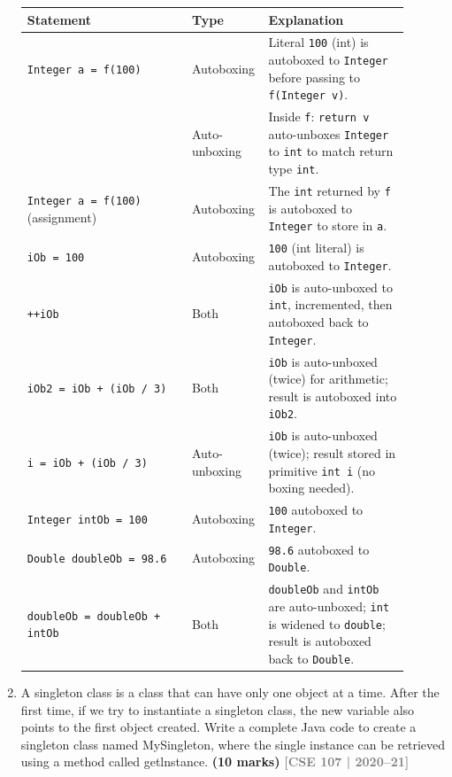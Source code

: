 \documentclass[12pt,a3paper]{article}
\newcommand{\yr}[1]{\hfill\textcolor{gray}{\small\textbf{[#1]}}}
\newcommand{\mk}[1]{\textcolor{orange!70!black}{\small\textbf{(#1 marks)}}}
\begin{document}
\begin{enumerate}
\begin{tcolorbox}
\begin{center}
\small
\begin{tabular}{@{}p{0.42\linewidth}p{0.12\linewidth}p{0.36\linewidth}@{}}
\toprule
\textbf{Statement} & \textbf{Type} & \textbf{Explanation} \\
\midrule
\texttt{Integer a = f(100)} &
  Auto\-boxing &
  Literal \texttt{100} (int) is autoboxed to \texttt{Integer}
  before passing to \texttt{f(Integer v)}. \\[4pt]
&  Auto-un\-boxing &
  Inside \texttt{f}: \texttt{return v} auto-unboxes \texttt{Integer}
  to \texttt{int} to match return type \texttt{int}. \\[4pt]
\texttt{Integer a = f(100)} (assignment) &
  Auto\-boxing &
  The \texttt{int} returned by \texttt{f} is autoboxed to
  \texttt{Integer} to store in \texttt{a}. \\[4pt]
\texttt{iOb = 100} &
  Auto\-boxing &
  \texttt{100} (int literal) is autoboxed to \texttt{Integer}. \\[4pt]
\texttt{++iOb} &
  Both &
  \texttt{iOb} is auto-unboxed to \texttt{int}, incremented, then
  autoboxed back to \texttt{Integer}. \\[4pt]
\texttt{iOb2 = iOb + (iOb / 3)} &
  Both &
  \texttt{iOb} is auto-unboxed (twice) for arithmetic; result is
  autoboxed into \texttt{iOb2}. \\[4pt]
\texttt{i = iOb + (iOb / 3)} &
  Auto-un\-boxing &
  \texttt{iOb} is auto-unboxed (twice); result stored in primitive
  \texttt{int i} (no boxing needed). \\[4pt]
\texttt{Integer intOb = 100} &
  Auto\-boxing &
  \texttt{100} autoboxed to \texttt{Integer}. \\[4pt]
\texttt{Double doubleOb = 98.6} &
  Auto\-boxing &
  \texttt{98.6} autoboxed to \texttt{Double}. \\[4pt]
\texttt{doubleOb = doubleOb + intOb} &
  Both &
  \texttt{doubleOb} and \texttt{intOb} are auto-unboxed; \texttt{int}
  is widened to \texttt{double}; result is autoboxed back to
  \texttt{Double}. \\
\bottomrule
\end{tabular}
\end{center}

\end{tcolorbox}

\item A singleton class is a class that can have only one object at a time. After the first
time, if we try to instantiate a singleton class, the new variable also points to the first
object created. Write a complete Java code to create a singleton class named
MySingleton, where the single instance can be retrieved using a method called
getlnstance. \mk{10}
\yr{CSE 107 | 2020--21}


\end{enumerate}
\end{document}
